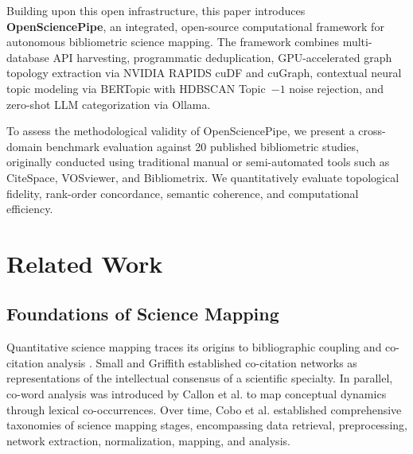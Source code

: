\documentclass[preprint,12pt]{elsarticle}
\begin{document}
Building upon this open infrastructure, this paper introduces \textbf{OpenSciencePipe}, an integrated, open-source computational framework for autonomous bibliometric science mapping. The framework combines multi-database API harvesting, programmatic deduplication, GPU-accelerated graph topology extraction via NVIDIA RAPIDS cuDF and cuGraph, contextual neural topic modeling via BERTopic \cite{grootendorst2022bertopic} with HDBSCAN Topic~$-1$ noise rejection, and zero-shot LLM categorization via Ollama. 

To assess the methodological validity of OpenSciencePipe, we present a cross-domain benchmark evaluation against 20 published bibliometric studies, originally conducted using traditional manual or semi-automated tools such as CiteSpace, VOSviewer, and Bibliometrix. We quantitatively evaluate topological fidelity, rank-order concordance, semantic coherence, and computational efficiency.

\section{Related Work}
\label{sec:related}
\subsection{Foundations of Science Mapping}
Quantitative science mapping traces its origins to bibliographic coupling \cite{kessler1963bibliographic} and co-citation analysis \cite{small1973co}. Small and Griffith \cite{small1974structure} established co-citation networks as representations of the intellectual consensus of a scientific specialty. In parallel, co-word analysis was introduced by Callon et al. \cite{callon1983co} to map conceptual dynamics through lexical co-occurrences. Over time, Cobo et al. \cite{cobo2011science, cobo2012scimat} established comprehensive taxonomies of science mapping stages, encompassing data retrieval, preprocessing, network extraction, normalization, mapping, and analysis.
\end{document}
